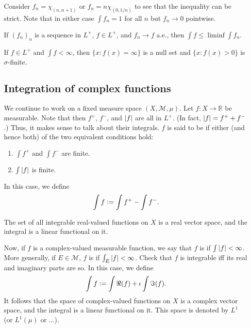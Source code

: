 \documentclass[12pt]{article}	%
\begin{document}
\begin{ex}
	Consider $f_{n} = \chi_{(n, n + 1)}$ or $f_{n} = n \chi_{(0, 1/n)}$ to see that the inequality can be strict. Note that in either case $\int f_{n} = 1$ for all $n$ but $f_{n} \to 0$ pointwise.
\end{ex}

\begin{cor}
	If $(f_{n})_{n}$ is a sequence in $L^{+}$, $f \in L^{+}$, and $f_{n} \to f$ a.e., then $\int f \le \liminf \int f_{n}$.
\end{cor}

\begin{prop}
	If $f \in L^{+}$ and $\int f < \infty$, then $\{x : f(x) = \infty\}$ is a null set and $\{x : f(x) > 0\}$ is $\sigma$-finite.
\end{prop}

\subsection{Integration of complex functions}

We continue to work on a fixed measure space $(X, \mathcal{M}, \mu)$. Let $f : X \to \mathbb{R}$ be measurable. Note that then $f^{+}$, $f^{-}$, and ${\left\lvert f \right\lvert}$ are all in $L^{+}$. (In fact, ${\left\lvert f \right\lvert} = f^{+} + f^{-}$.) Thus, it makes sense to talk about their integrals. \newline
$f$ is said to be  if either (and hence both) of the two equivalent conditions hold:
\begin{enumerate}
	\item $\int f^{+}$ and $\int f^{-}$ are finite.
	\item $\int {\left\lvert f \right\lvert}$ is finite.
\end{enumerate}

In this case, we define
\begin{equation*} 
	\int f \vcentcolon= \int f^{+} - \int f^{-}.
\end{equation*}

\begin{prop}
	The set of all integrable real-valued functions on $X$ is a real vector space, and the integral is a linear functional on it.
\end{prop}

Now, if $f$ is a complex-valued measurable function, we say that $f$ is  if $\int {\left\lvert f \right\lvert} < \infty$. More generally, if $E \in \mathcal{M}$, $f$ is  if $\int_{E} {\left\lvert f \right\lvert} < \infty$. Check that $f$ is integrable iff its real and imaginary parts are so. In this case, we define
\begin{equation*} 
	\int f \vcentcolon= \int \Re(f) + \iota \int \Im(f).
\end{equation*}
It follows that the space of complex-valued functions on $X$ is a complex vector space, and the integral is a linear functional on it. This space is denoted by $L^{1}$ (or $L^{1}(\mu)$ or ...). 
\end{document}
